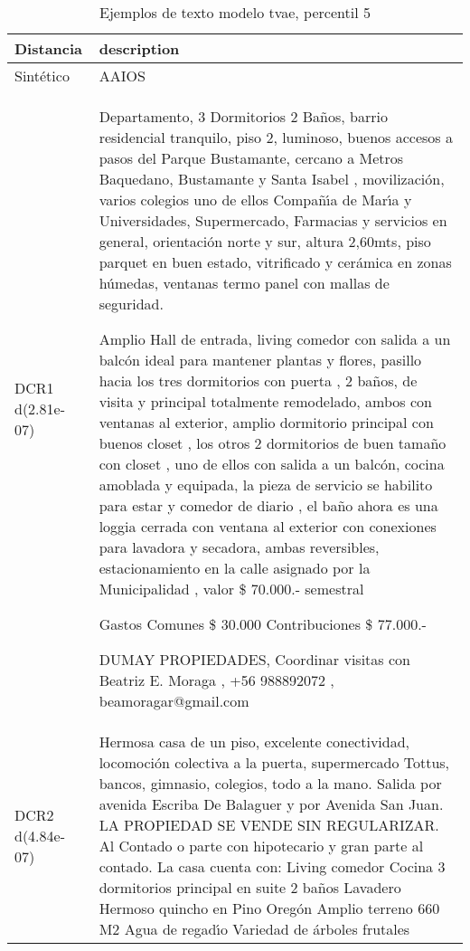 \begin{table}[H]
\centering
\fontsize{10}{14}\selectfont
\caption{Ejemplos de texto modelo tvae, percentil 5}
\label{table-example-economicos-a-1-tvae-5p-text}
\begin{tabular}{|l|m{35em}|}
\hline
\rowcolor[gray]{0.8}
Distancia & description \\
\hline Sintético & AAIOS \\
\hline DCR1 d(2.81e-07) & Departamento, 3 Dormitorios 2 Ba\~nos, barrio residencial tranquilo, piso 2, luminoso, buenos accesos a pasos del Parque Bustamante, cercano a Metros Baquedano, Bustamante y Santa Isabel , movilizaci\'on, varios colegios uno de ellos Compa\~n{\'\i}a de Mar{\'\i}a y  Universidades,  Supermercado, Farmacias  y servicios en general,  orientaci\'on norte y sur, altura 2,60mts,  piso parquet en buen estado, vitrificado y cer\'amica en zonas h\'umedas, ventanas termo panel con mallas de seguridad.  

Amplio Hall de entrada, living comedor con salida a un balc\'on ideal para mantener  plantas y flores,  pasillo hacia los tres dormitorios con puerta , 2 ba\~nos, de visita y principal  totalmente remodelado, ambos con ventanas al exterior, amplio dormitorio principal con  buenos closet , los otros 2 dormitorios de buen tama\~no  con closet , uno de ellos con salida a un balc\'on, cocina amoblada y equipada,  la pieza de servicio se habilito para estar y comedor de diario , el ba\~no  ahora es una loggia cerrada con ventana al exterior con conexiones para lavadora y secadora, ambas reversibles, estacionamiento en la calle asignado por la Municipalidad , valor \$ 70.000.- semestral


Gastos Comunes \$ 30.000
Contribuciones \$ 77.000.-

DUMAY PROPIEDADES,  Coordinar visitas con Beatriz E. Moraga , +56 988892072   , beamoragar@gmail.com \\
\hline DCR2 d(4.84e-07) & Hermosa casa de un piso, excelente conectividad, locomoci\'on colectiva a la puerta, supermercado Tottus, bancos, gimnasio, colegios, todo a la mano. Salida por avenida Escriba De Balaguer y por Avenida San Juan. LA PROPIEDAD SE VENDE SIN REGULARIZAR. Al Contado o parte con hipotecario y gran parte al contado. La casa cuenta con: Living comedor Cocina 3 dormitorios principal en suite 2 ba\~nos Lavadero Hermoso quincho en Pino Oreg\'on Amplio terreno 660 M2 Agua de regad{\'\i}o Variedad de \'arboles frutales \\
\hline
\end{tabular}
\end{table}
